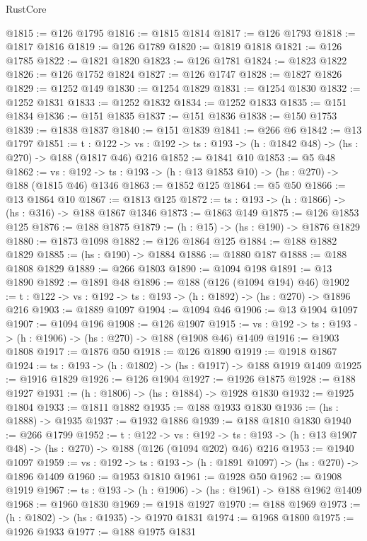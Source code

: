 \begin{lexlean}{RustCore}
\begin{coremodule}
@1815 := @126 @1795
@1816 := @1815 @1814
@1817 := @126 @1793
@1818 := @1817 @1816
@1819 := @126 @1789
@1820 := @1819 @1818
@1821 := @126 @1785
@1822 := @1821 @1820
@1823 := @126 @1781
@1824 := @1823 @1822
@1826 := @126 @1752 @1824
@1827 := @126 @1747
@1828 := @1827 @1826
@1829 := @1252 @149
@1830 := @1254 @1829
@1831 := @1254 @1830
@1832 := @1252 @1831
@1833 := @1252 @1832
@1834 := @1252 @1833
@1835 := @151 @1834
@1836 := @151 @1835
@1837 := @151 @1836
@1838 := @150 @1753
@1839 := @1838 @1837
@1840 := @151 @1839
@1841 := @266 @6
@1842 := @13 @1797
@1851 := {t : @122} ->
  {vs : @192} -> {ts : @193} -> (h : @1842 @48) -> (hs : @270) -> @188 (@1817 @46) @216
@1852 := @1841 @10
@1853 := @5 @48
@1862 := {vs : @192} -> {ts : @193} -> (h : @13 @1853 @10) -> (hs : @270) -> @188 (@1815 @46) @1346
@1863 := @1852 @125
@1864 := @5 @50
@1866 := @13 @1864 @10
@1867 := @1813 @125
@1872 := {ts : @193} -> (h : @1866) -> (hs : @316) -> @188 @1867 @1346
@1873 := @1863 @149
@1875 := @126 @1853 @125
@1876 := @188 @1875
@1879 := (h : @15) -> (hs : @190) -> @1876 @1829
@1880 := @1873 @1098
@1882 := @126 @1864 @125
@1884 := @188 @1882 @1829
@1885 := (hs : @190) -> @1884
@1886 := @1880 @187
@1888 := @188 @1808 @1829
@1889 := @266 @1803
@1890 := @1094 @198
@1891 := @13 @1890
@1892 := @1891 @48
@1896 := @188 (@126 (@1094 @194) @46)
@1902 := {t : @122} -> {vs : @192} -> {ts : @193} -> (h : @1892) -> (hs : @270) -> @1896 @216
@1903 := @1889 @1097
@1904 := @1094 @46
@1906 := @13 @1904 @1097
@1907 := @1094 @196
@1908 := @126 @1907
@1915 := {vs : @192} -> {ts : @193} -> (h : @1906) -> (hs : @270) -> @188 (@1908 @46) @1409
@1916 := @1903 @1808
@1917 := @1876 @50
@1918 := @126 @1890
@1919 := @1918 @1867
@1924 := {ts : @193} -> (h : @1802) -> (hs : @1917) -> @188 @1919 @1409
@1925 := @1916 @1829
@1926 := @126 @1904
@1927 := @1926 @1875
@1928 := @188 @1927
@1931 := (h : @1806) -> (hs : @1884) -> @1928 @1830
@1932 := @1925 @1804
@1933 := @1811 @1882
@1935 := @188 @1933 @1830
@1936 := (hs : @1888) -> @1935
@1937 := @1932 @1886
@1939 := @188 @1810 @1830
@1940 := @266 @1799
@1952 := {t : @122} ->
  {vs : @192} ->
  {ts : @193} -> (h : @13 @1907 @48) -> (hs : @270) -> @188 (@126 (@1094 @202) @46) @216
@1953 := @1940 @1097
@1959 := {vs : @192} -> {ts : @193} -> (h : @1891 @1097) -> (hs : @270) -> @1896 @1409
@1960 := @1953 @1810
@1961 := @1928 @50
@1962 := @1908 @1919
@1967 := {ts : @193} -> (h : @1906) -> (hs : @1961) -> @188 @1962 @1409
@1968 := @1960 @1830
@1969 := @1918 @1927
@1970 := @188 @1969
@1973 := (h : @1802) -> (hs : @1935) -> @1970 @1831
@1974 := @1968 @1800
@1975 := @1926 @1933
@1977 := @188 @1975 @1831

\end{coremodule}
\end{lexlean}
